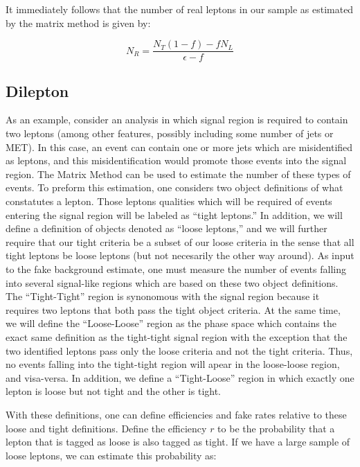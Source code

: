 It immediately follows that the number of real leptons in our sample as estimated by the matrix method is given by:

\begin{equation}
  \label{eqn:single_lepton_matrix_standard_num_real}
  N_{R} = \frac{N_T(1-f) - f N_L}{\epsilon - f}
\end{equation}


\subsection{Dilepton}

As an example, consider an analysis in which signal region is required to contain two leptons (among other features, possibly including some number of jets or MET).
In this case, an event can contain one or more jets which are misidentified as leptons, and this misidentification would promote those events into the signal region.
The Matrix Method can be used to estimate the number of these types of events.
To preform this estimation, one considers two object definitions of what constatutes a lepton.  
Those leptons qualities which will be required of events entering the signal region will be labeled as ``tight leptons.''
In addition, we will define a definition of objects denoted as ``loose leptons,'' and we will further require that our tight criteria be a subset of our loose criteria in the sense that all tight leptons be loose leptons (but not necesarily the other way around).
As input to the fake background estimate, one must measure the number of events falling into several signal-like regions which are based on these two object definitions.
The ``Tight-Tight'' region is synonomous with the signal region because it requires two leptons that both pass the tight object criteria.
At the same time, we will define the ``Loose-Loose'' region as the phase space which contains the exact same definition as the tight-tight signal region with the exception that the two identified leptons pass only the loose criteria and not the tight criteria.
Thus, no events falling into the tight-tight region will apear in the loose-loose region, and visa-versa.
In addition, we define a ``Tight-Loose'' region in which exactly one lepton is loose but not tight and the other is tight.

With these definitions, one can define efficiencies and fake rates relative to these loose and tight definitions.
Define the efficiency $r$ to be the probability that a lepton that is tagged as loose is also tagged as tight.
If we have a large sample of loose leptons, we can estimate this probability as:


